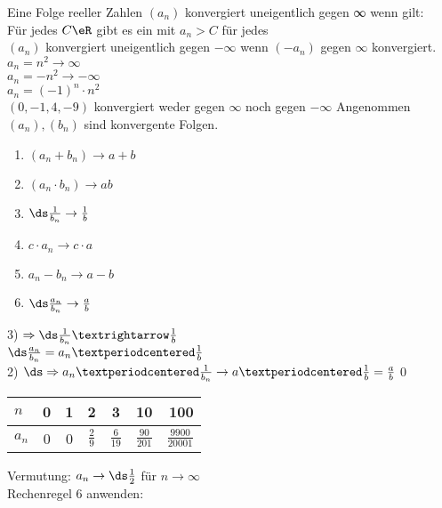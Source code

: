 %
%
\wdh
Eine Folge reeller Zahlen $(a_n)$ konvergiert uneigentlich gegen ∞ wenn gilt:\\
Für jedes $C\eR$ gibt es ein \nN{} mit $a_n > C$ für jedes \nN\\[4pt]
$(a_n)$ konvergiert uneigentlich gegen $- ∞$ wenn $(-a_n)$ gegen $∞$ konvergiert.\\
%
%
\bsp
$a_n = n^2 \to ∞$\\
$a_n = -n^2 \to -∞$\\
$a_n = (-1)^n · n^2$\\
$(0, -1, 4, -9)$ konvergiert weder gegen $∞$ noch gegen $ - ∞$
%
Angenommen $(a_n), (b_n)$ sind konvergente Folgen.\\
\begin{enumerate}
\item{$(a_n + b_n) \to a + b$}
\item{$(a_n · b_n) \to ab$}
\item{$\ds\frac{1}{b_n} \to \frac{1}{b}$}
\item{$c · a_n \to c · a$}
\item{$a_n - b_n \to a - b$}
\item{$\ds\frac{a_n}{b_n} \to \frac{a}{b}$}
\end{enumerate}
%
3) $\Rightarrow\ds\frac{1}{b_n}→\frac{1}{b}$\\
$\ds\frac{a_n}{b_n} = a_n ·\frac{1}{b}$\\
2) $\ds\Rightarrow a_n · \frac{1}{b_n} \to a ·\frac{1}{b} = \frac{a}{b}$\qed
%
\bsp
\begin{tabular}{l|c|c|c|c|c|r}
$n$   & 0 & 1 & 2 & 3 & 10 & 100\\\hline
$a_n$ & 0 & 0 & $\frac{2}{9}$ & $\frac{6}{19}$ & $\frac{90}{201}$ & $\frac{9900}{20001}$ \\
\end{tabular}
\vspace{5mm}
Vermutung: $a_n \to \ds\frac{1}{2}$ für $n \to ∞$\\
Rechenregel 6 anwenden:\\
